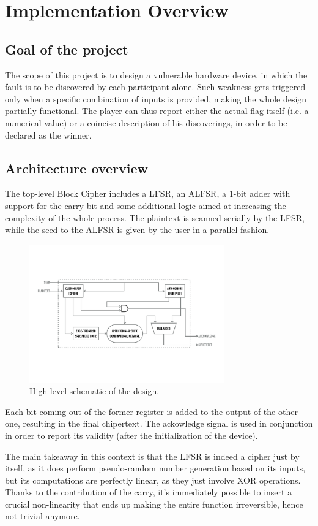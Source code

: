 \chapter{Implementation Overview}
\label{Chapter3}
\section{Goal of the project}
The scope of this project is to design a vulnerable hardware device, in which the fault is to be discovered by each participant alone. Such weakness gets triggered only when a specific combination of inputs is provided, making the whole design partially functional.
The player can thus report either the actual flag itself (i.e. a numerical value) or a coincise description of his discoverings, in order to be declared as the winner.
\section{Architecture overview}
The top-level Block Cipher includes a LFSR, an ALFSR, a 1-bit adder with support for the carry bit and some additional logic aimed at increasing the complexity of the whole process.
The plaintext is scanned serially by the LFSR, while the seed to the ALFSR is given by the user in a parallel fashion.
\begin{figure}[!ht]
\vspace{0.5cm}
\centering
\includegraphics[width=0.75\textwidth]{images/Schematic.png}
\caption{High-level schematic of the design.}
\end{figure}
Each bit coming out of the former register is added to the output of the other one, resulting in the final chipertext. The ackowledge signal is used in conjunction in order to report its validity (after the initialization of the device).

The main takeaway in this context is that the LFSR is indeed a cipher just by itself, as it does perform pseudo-random number generation based on its inputs, but its computations are perfectly linear, as they just involve XOR operations.
Thanks to the contribution of the carry, it's immediately possible to insert a crucial non-linearity that ends up making the entire function irreversible, hence not trivial anymore.
